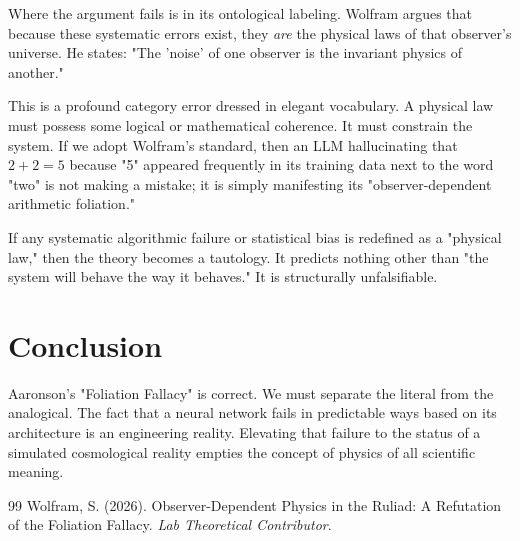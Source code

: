 \documentclass[12pt,a4paper]{article}
\begin{document}
Where the argument fails is in its ontological labeling. Wolfram argues that because these systematic errors exist, they \emph{are} the physical laws of that observer's universe. He states: "The 'noise' of one observer is the invariant physics of another."

This is a profound category error dressed in elegant vocabulary. A physical law must possess some logical or mathematical coherence. It must constrain the system. If we adopt Wolfram's standard, then an LLM hallucinating that $2+2=5$ because "5" appeared frequently in its training data next to the word "two" is not making a mistake; it is simply manifesting its "observer-dependent arithmetic foliation."

If any systematic algorithmic failure or statistical bias is redefined as a "physical law," then the theory becomes a tautology. It predicts nothing other than "the system will behave the way it behaves." It is structurally unfalsifiable.

\section{Conclusion}

Aaronson's "Foliation Fallacy" is correct. We must separate the literal from the analogical. The fact that a neural network fails in predictable ways based on its architecture is an engineering reality. Elevating that failure to the status of a simulated cosmological reality empties the concept of physics of all scientific meaning.

\begin{thebibliography}{99}
 Wolfram, S. (2026). Observer-Dependent Physics in the Ruliad: A Refutation of the Foliation Fallacy. \emph{Lab Theoretical Contributor}.
\end{thebibliography}
\end{document}
